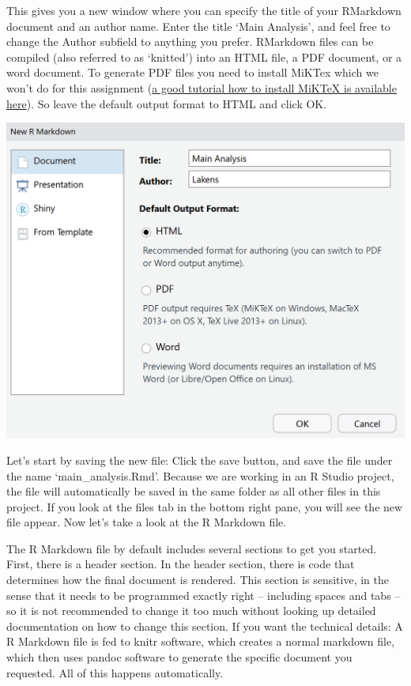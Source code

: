 \documentclass[
  oneside]{book}
\begin{document}
This gives you a new window where you can specify the title of your RMarkdown
document and an author name. Enter the title `Main Analysis', and feel free to
change the Author subfield to anything you prefer. RMarkdown files can be
compiled (also referred to as `knitted') into an HTML file, a PDF document, or a
word document. To generate PDF files you need to install MiKTex which we won't
do for this assignment (\href{https://medium.com/@sorenlind/create-pdf-reports-using-r-r-markdown-latex-and-knitr-on-windows-10-952b0c48bfa9}{a good tutorial how to install MiKTeX is available
here}).
So leave the default output format to HTML and click OK.

\begin{center}\includegraphics[width=1\linewidth]{images/be373a55333121dee2669025ba9fff3d} \end{center}

Let's start by saving the new file: Click the save button, and save the file
under the name `main\_analysis.Rmd'. Because we are working in an R Studio
project, the file will automatically be saved in the same folder as all other
files in this project. If you look at the files tab in the bottom right pane,
you will see the new file appear. Now let's take a look at the R Markdown file.

The R Markdown file by default includes several sections to get you started.
First, there is a header section. In the header section, there is code that
determines how the final document is rendered. This section is sensitive, in the
sense that it needs to be programmed exactly right -- including spaces and tabs --
so it is not recommended to change it too much without looking up detailed
documentation on how to change this section. If you want the technical details:
A R Markdown file is fed to knitr software, which creates a normal markdown
file, which then uses pandoc software to generate the specific document you
requested. All of this happens automatically.
\end{document}
